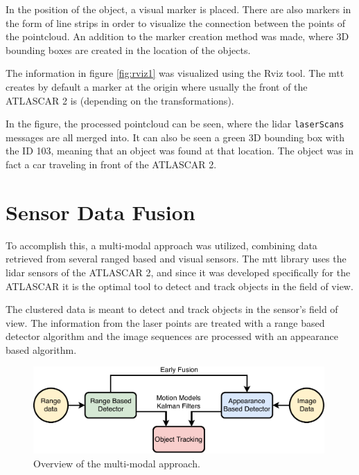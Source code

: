 In the position of the object, a visual marker is placed. There are also markers in the form of line strips in order to visualize the connection between the points of the pointcloud. An addition to the marker creation method was made, where 3D bounding boxes are created in the location of the objects.

The information in figure \ref{fig:rviz1} was visualized using the Rviz tool. The \gls{mtt} creates by default a marker at the origin where usually the front of the ATLASCAR 2 is (depending on the transformations). 

In the figure, the processed pointcloud can be seen, where the \gls{lidar} \texttt{laserScans} messages are all merged into. It can also be seen a green 3D bounding box with the ID 103, meaning that an object was found at that location. The object was in fact a car traveling in front of the ATLASCAR 2. 

\section{Sensor Data Fusion}

To accomplish this, a multi-modal approach was utilized, combining data retrieved from several ranged based and visual sensors. The \gls{mtt} library uses the \gls{lidar} sensors of the ATLASCAR 2, and since it was developed specifically for the ATLASCAR it is the optimal tool to detect and track objects in the field of view. 

The clustered data is meant to detect and track objects in the sensor's field of view. The information from the laser points are treated with a range based detector algorithm and the image sequences are processed with an appearance based algorithm.

\begin{figure}[htp]
	
	\centering
	\includegraphics[width=0.99\textwidth]{caplabel/imgs/multimodal}
	
	\caption{ Overview of the multi-modal approach. }
	\label{fig:basket}
	
\end{figure}

